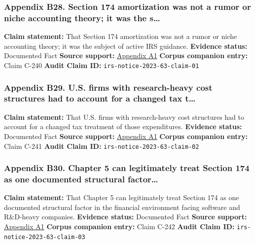 \documentclass[
  american,
  11pt,
  letterpaper,
]{article}
\begin{document}
\subsubsection{Appendix B28. Section 174 amortization was not a rumor or
niche accounting theory; it was the
s\ldots{}}\label{ch-05-appendix-b28-section-174-amortization-was-not-a-rumor-or-niche-accounting-theory-it-was-the-s}

\textbf{Claim statement:} That Section 174 amortization was not a rumor
or niche accounting theory; it was the subject of active IRS guidance.
\textbf{Evidence status:} Documented Fact \textbf{Source support:}
\hyperref[ch-05-appendix-a1-notice-2023-63-guidance-on-section-174-and-specified-research-or-experimental-expenditures]{Appendix
A1} \textbf{Corpus companion entry:} Claim C-240 \textbf{Audit Claim
ID:} \texttt{irs-notice-2023-63-claim-01}

\subsubsection{Appendix B29. U.S. firms with research-heavy cost
structures had to account for a changed tax
t\ldots{}}\label{ch-05-appendix-b29-u-s-firms-with-research-heavy-cost-structures-had-to-account-for-a-changed-tax-t}

\textbf{Claim statement:} That U.S. firms with research-heavy cost
structures had to account for a changed tax treatment of those
expenditures. \textbf{Evidence status:} Documented Fact \textbf{Source
support:}
\hyperref[ch-05-appendix-a1-notice-2023-63-guidance-on-section-174-and-specified-research-or-experimental-expenditures]{Appendix
A1} \textbf{Corpus companion entry:} Claim C-241 \textbf{Audit Claim
ID:} \texttt{irs-notice-2023-63-claim-02}

\subsubsection{Appendix B30. Chapter 5 can legitimately treat Section
174 as one documented structural
factor\ldots{}}\label{ch-05-appendix-b30-chapter-5-can-legitimately-treat-section-174-as-one-documented-structural-factor}

\textbf{Claim statement:} That Chapter 5 can legitimately treat Section
174 as one documented structural factor in the financial environment
facing software and R\&D-heavy companies. \textbf{Evidence status:}
Documented Fact \textbf{Source support:}
\hyperref[ch-05-appendix-a1-notice-2023-63-guidance-on-section-174-and-specified-research-or-experimental-expenditures]{Appendix
A1} \textbf{Corpus companion entry:} Claim C-242 \textbf{Audit Claim
ID:} \texttt{irs-notice-2023-63-claim-03}
\end{document}
